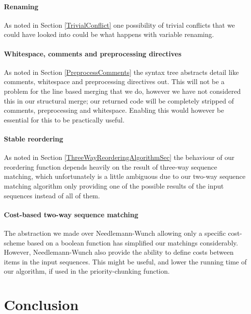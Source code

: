 \documentclass[11pt]{article}
\begin{document}
\paragraph{Renaming} As noted in Section \ref{TrivialConflict} one possibility of trivial conflicts that we could have looked into could be what happens with variable renaming. 

\paragraph{Whitespace, comments and preprocessing directives} As noted in Section \ref{PreprocessComments} the syntax tree abstracts detail like comments, whitespace and preprocessing directives out. This will not be a problem for the line based merging that we do, however we have not considered this in our structural merge; our returned code will be completely stripped of comments, preprocessing and whitespace. Enabling this would however be essential for this to be practically useful.

\paragraph{Stable reordering} As noted in Section \ref{ThreeWayReorderingAlgorithmSec} the behaviour of our reordering function depends heavily on the result of three-way sequence matching, which unfortunately is a little ambiguous due to our two-way sequence matching algorithm only providing one of the possible results of the input sequences instead of all of them.

\paragraph{Cost-based two-way sequence matching} The abstraction we made over Needlemann-Wunch allowing only a specific cost-scheme based on a boolean function has simplified our matchings considerably. However, Needlemann-Wunch also provide the ability to define costs between items in the input sequences. This might be useful, and lower the running time of our algorithm, if used in the priority-chunking function.

\clearpage
\section{Conclusion}

\clearpage

\listofalgorithms

\clearpage



\end{document}
